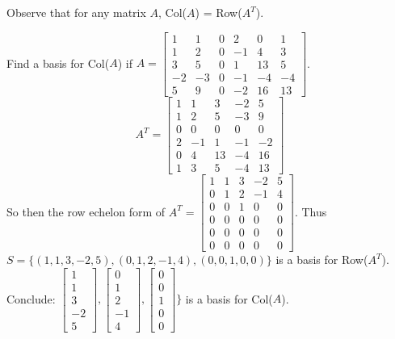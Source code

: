 \documentclass[12pt]{article}
\begin{document}
Observe that for any matrix $A$, Col($A$) = Row($A^T$). 
\begin{example} Find a basis for Col($A$) if $A = \begin{bmatrix}
1 & 1 & 0 & 2 & 0 & 1 \\
1 & 2 & 0 & -1 & 4 & 3 \\
3 & 5 & 0 & 1 & 13 & 5 \\
-2 & -3 & 0 & -1 & -4 & -4 \\
5 & 9 & 0 & -2 & 16 & 13
\end{bmatrix} $. $$A^T = \begin{bmatrix}
1 & 1 & 3 & -2 & 5 \\
1 & 2 & 5 & -3 & 9 \\
0 & 0 & 0 & 0 & 0 \\
2 & -1 & 1 & -1 & -2 \\
0 & 4 & 13 & -4 & 16 \\
1 & 3 & 5 & -4 & 13
\end{bmatrix} $$ So then the row echelon form of $A^T = \begin{bmatrix}
1 & 1 & 3 & -2 & 5 \\
0 & 1 & 2 & -1 & 4 \\
0 & 0 & 1 & 0 & 0 \\
0 & 0 & 0 & 0 & 0 \\
0 & 0 & 0 & 0 & 0 \\
0 & 0 & 0 & 0 & 0
\end{bmatrix} $. Thus $S = \{(1, 1, 3, -2, 5), (0, 1, 2, -1, 4), (0, 0, 1, 0, 0)\}$ is a basis for Row($A^T$). \newline Conclude: $\begin{bmatrix} 1 \\ 1 \\ 3 \\ -2 \\ 5 \end{bmatrix}, \begin{bmatrix} 0 \\ 1 \\ 2 \\ -1 \\ 4 \end{bmatrix}, \begin{bmatrix} 0 \\ 0 \\ 1 \\ 0 \\ 0 \end{bmatrix}\}$ is a basis for Col($A$). \end{example}
\end{document}
